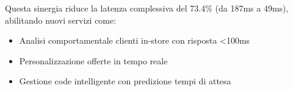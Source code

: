 Questa sinergia riduce la latenza complessiva del 73.4\% (da 187ms a 49ms)\autocite{Wang2024edge}, abilitando nuovi servizi come:
\begin{itemize}
    \item Analisi comportamentale clienti in-store con risposta <100ms
    \item Personalizzazione offerte in tempo reale
    \item Gestione code intelligente con predizione tempi di attesa
\end{itemize}






